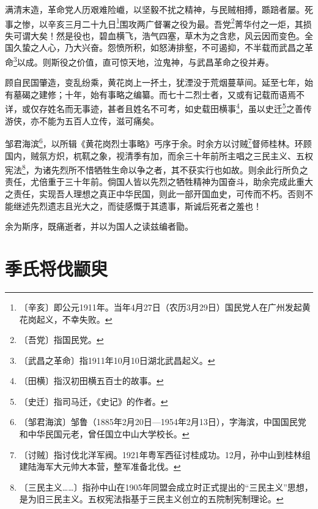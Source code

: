 \documentclass[12pt,UTF-8,openany]{ctexbook}
\begin{document}
\begin{normalsize}
    
    满清末造，革命党人历艰难险巇，以坚毅不扰之精神，与民贼相搏，踬踣者屡。死事之惨，以辛亥三月二十九日\footnote{〔辛亥〕即公元1911年。当年4月27日（农历3月29日）国民党人在广州发起黄花岗起义，不幸失败。}围攻两广督署之役为最。吾党\footnote{〔吾党〕指国民党。}菁华付之一炬，其损失可谓大矣！然是役也，碧血横飞，浩气四塞，草木为之含悲，风云因而变色。全国久蛰之人心，乃大兴奋。怨愤所积，如怒涛排壑，不可遏抑，不半载而武昌之革命\footnote{〔武昌之革命〕指1911年10月10日湖北武昌起义。}以成。则斯役之价值，直可惊天地，泣鬼神，与武昌革命之役并寿。
    
    顾自民国肇造，变乱纷乘，黄花岗上一抔土，犹湮没于荒烟蔓草间。延至七年，始有墓碣之建修；十年，始有事略之编纂。而七十二烈士者，又或有记载而语焉不详，或仅存姓名而无事迹，甚者且姓名不可考，如史载田横事\footnote{〔田横〕指汉初田横五百士的故事。}，虽以史迁\footnote{〔史迁〕指司马迁，《史记》的作者。}之善传游侠，亦不能为五百人立传，滋可痛矣。
    
    邹君海滨\footnote{〔邹君海滨〕邹鲁（1885年2月20日—1954年2月13日），字海滨，中国国民党和中华民国元老，曾任国立中山大学校长。}，以所辑《黄花岗烈士事略》丐序于余。时余方以讨贼\footnote{〔讨贼〕指讨伐北洋军阀。1921年粤军西征讨桂成功。12月，孙中山到桂林组建陆海军大元帅大本营，整军准备北伐。}督师桂林。环顾国内，贼氛方炽，杌靰之象，视清季有加，而余三十年前所主唱之三民主义、五权宪法\footnote{〔三民主义……〕指孙中山在1905年同盟会成立时正式提出的“三民主义”思想，是为旧三民主义。五权宪法指基于三民主义创立的五院制宪制理论。}，为诸先烈所不惜牺牲生命以争之者，其不获实行也如故。则余此行所负之责任，尤倍重于三十年前。倘国人皆以先烈之牺牲精神为国奋斗，助余完成此重大之责任，实现吾人理想之真正中华民国，则此一部开国血史，可传而不朽。否则不能继述先烈遗志且光大之，而徒感慨于其遗事，斯诚后死者之羞也！
    
    余为斯序，既痛逝者，并以为国人之读兹编者勖。
\end{normalsize}



\chapter{季氏将伐颛臾}
\end{document}

